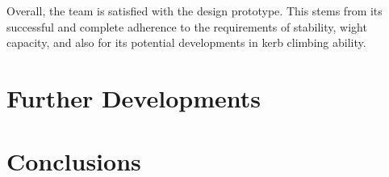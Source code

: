 \documentclass [12pt]{article}
\begin{document}
Overall, the team is satisfied with the design prototype. This stems from its successful and complete adherence to the requirements of stability, wight capacity, and also for its potential developments in kerb climbing ability.  

\newpage
\section{Further Developments}

\newpage
\section{Conclusions}

\newpage



\appendix
\end{document}
